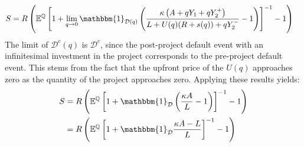 \documentclass[../main.tex]{subfiles}
\begin{document}
            \begin{align}
                    S
                &=
                    \grossrfrate
                    \left(
                        \mathbb{E}^{\rnmeasure}\left[
                            1
                            +
                            \lim_{q\rightarrow 0}
                            \mathbbm{1}_{\mathcal{D}(q)}
                            \left(
                                \frac{
                                    \kappa 
                                    \left(
                                        A + q Y_{1} + q Y_{2}^{+}
                                    \right)
                                }{
                                    L 
                                    +
                                    U(q)
                                    (\grossrfrate + s(q))
                                    +
                                    q Y_{2}^{-} 
                                }
                                -
                                1
                            \right) 
                        \right]^{-1}
                        - 
                        1
                    \right)
                \nonumber
            \end{align}
        The limit of $\mathcal{D}^{c}(q)$ is $\mathcal{D}^{c}$,
        since the post-project default event with an infinitesimal investment in the project
        corresponds to the pre-project default event.
        This stems from the fact that the upfront price of the $U(q)$
        approaches zero as the quantity of the project approaches zero.
        Applying these results yields:
            \begin{align}
                    S
                &=
                    \grossrfrate
                    \left(
                        \mathbb{E}^{\rnmeasure}\left[
                            1
                            +
                            \mathbbm{1}_{\mathcal{D}}
                            \left(
                                \frac{
                                    \kappa 
                                    A
                                }{
                                    L 
                                }
                                -
                                1
                            \right) 
                        \right]^{-1}
                        - 
                        1
                    \right)
                \nonumber \\
                &=
                    \grossrfrate
                    \left(
                        \mathbb{E}^{\rnmeasure}\left[
                            1
                            +
                            \mathbbm{1}_{\mathcal{D}}
                                \frac{
                                    \kappa 
                                    A
                                    -
                                    L
                                }{
                                    L 
                                }
                        \right]^{-1}
                        - 
                        1
                    \right)
                \label{eqn:limiting-credit-spread-step-1}
            \end{align}
\end{document}
